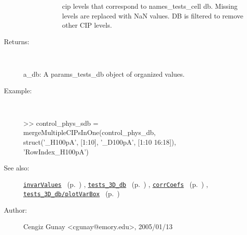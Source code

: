 \begin{description}
\begin{description}
\begin{description}
cip levels that correspond to names\_tests\_cell db. Missing 
levels are replaced with NaN values. DB is filtered to
remove other CIP levels.
\end{description}%
\end{description}%
%
\item[Returns:
]~

	a\_db: A params\_tests\_db object of organized values.
%
\item[Example:]~
\begin{lyxcode}        >> control\_phys\_sdb = 
\\%
             mergeMultipleCIPsInOne(control\_phys\_db, 
\\%
                                     struct('\_H100pA', [1:10], '\_D100pA', [1:10 16:18]), 
\\%
                                     'RowIndex\_H100pA')
\\%
\end{lyxcode}
%
\item[See also:]%
\hyperlink{ref_invarValues}{\texttt{invarValues}}%
\ (p.~\pageref{ref_invarValues})%
%
, \hyperlink{ref_tests_3D_db}{\texttt{tests\_3D\_db}}%
\ (p.~\pageref{ref_tests_3D_db})%
%
, \hyperlink{ref_corrCoefs}{\texttt{corrCoefs}}%
\ (p.~\pageref{ref_corrCoefs})%
%
, \hyperlink{ref_tests_3D_db__plotVarBox}{\texttt{tests\_3D\_db/plotVarBox}}%
\ (p.~\pageref{ref_tests_3D_db__plotVarBox})%
%
%
\item[Author:]%
Cengiz Gunay <cgunay@emory.edu>, 2005/01/13
%
\end{description}
\methodline%
